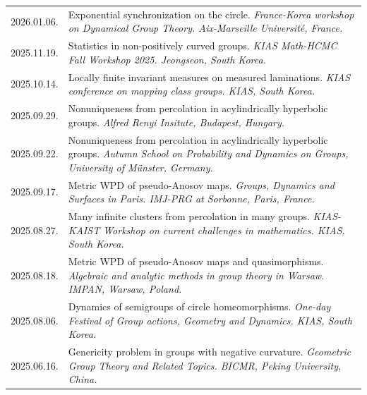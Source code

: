 \documentclass[a4paper, 10pt]{article}
\begin{document}
\begin{tabular}{Q{2.45cm}P{13cm}}
\small{2026.01.06.} & Exponential synchronization on the circle. \textit{France-Korea workshop on Dynamical Group Theory. Aix-Marseille Université, France.}\\
\small{2025.11.19.} &  Statistics in non-positively curved groups. \textit{KIAS Math-HCMC Fall Workshop 2025. Jeongseon, South Korea.}\\
\small{2025.10.14.} &  Locally finite invariant measures on measured laminations. \textit{KIAS conference on mapping class groups. KIAS, South Korea.}\\
\small{2025.09.29.} &  Nonuniqueness from percolation in acylindrically hyperbolic groups. \textit{Alfred Renyi Insitute, Budapest, Hungary.}\\
\small{2025.09.22.} & Nonuniqueness from percolation in acylindrically hyperbolic groups. \textit{Autumn School on Probability and Dynamics on Groups, University of Münster, Germany.}\\
\small{2025.09.17.} & Metric WPD of pseudo-Anosov maps. \textit{Groups, Dynamics and Surfaces in Paris. IMJ-PRG at Sorbonne, Paris, France.}\\
\small{2025.08.27.} & Many infinite clusters from percolation in many groups. \textit{KIAS-KAIST Workshop on current challenges in mathematics. KIAS, South Korea.}\\
\small{2025.08.18.} & Metric WPD of pseudo-Anosov maps and quasimorphisms. \textit{Algebraic and analytic methods in group theory in Warsaw. IMPAN, Warsaw, Poland.}\\
\small{2025.08.06.} & Dynamics of semigroups of circle homeomorphisms. \textit{One-day Festival of Group actions, Geometry and Dynamics. KIAS, South Korea.}\\
\small{2025.06.16.} & Genericity problem in groups with negative curvature. \textit{Geometric Group Theory and Related Topics. BICMR, Peking University, China.}\\
\end{tabular}
\end{document}
